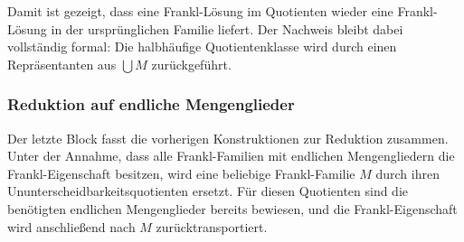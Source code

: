 \documentclass[main.tex]{subfiles}
\begin{document}
\begin{tabproof}
\end{tabproof}

Damit ist gezeigt, dass eine Frankl-Lösung im Quotienten wieder eine
Frankl-Lösung in der ursprünglichen Familie liefert. Der Nachweis bleibt dabei
vollständig formal: Die halbhäufige Quotientenklasse wird durch einen
Repräsentanten aus \(\bigcup M\) zurückgeführt.

\subsubsection{Reduktion auf endliche Mengenglieder}

Der letzte Block fasst die vorherigen Konstruktionen zur Reduktion zusammen.
Unter der Annahme, dass alle Frankl-Familien mit endlichen Mengengliedern die
Frankl-Eigenschaft besitzen, wird eine beliebige Frankl-Familie \(M\) durch
ihren Ununterscheidbarkeitsquotienten ersetzt. Für diesen Quotienten sind die
benötigten endlichen Mengenglieder bereits bewiesen, und die Frankl-Eigenschaft
wird anschließend nach \(M\) zurücktransportiert.
\end{document}
